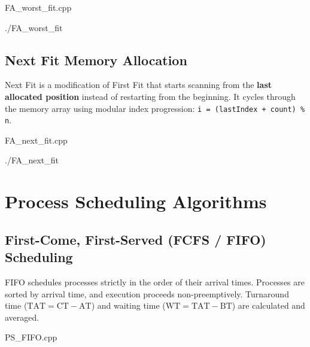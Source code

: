 \documentclass[11pt,a4paper]{article}
\begin{document}
\begin{codebox}{FA\_worst\_fit.cpp}

\end{codebox}

\vspace{0.8em}
\begin{termbox}{./FA\_worst\_fit}

\end{termbox}

\newpage

\subsection{Next Fit Memory Allocation}
Next Fit is a modification of First Fit that starts scanning from the \textbf{last allocated position} instead of restarting from the beginning. It cycles through the memory array using modular index progression: \texttt{i = (lastIndex + count) \% n}.

\begin{codebox}{FA\_next\_fit.cpp}

\end{codebox}

\vspace{0.8em}
\begin{termbox}{./FA\_next\_fit}

\end{termbox}

\newpage

\section{Process Scheduling Algorithms}

\subsection{First-Come, First-Served (FCFS / FIFO) Scheduling}
FIFO schedules processes strictly in the order of their arrival times. Processes are sorted by arrival time, and execution proceeds non-preemptively. Turnaround time ($\text{TAT} = \text{CT} - \text{AT}$) and waiting time ($\text{WT} = \text{TAT} - \text{BT}$) are calculated and averaged.

\begin{codebox}{PS\_FIFO.cpp}

\end{codebox}
\end{document}
